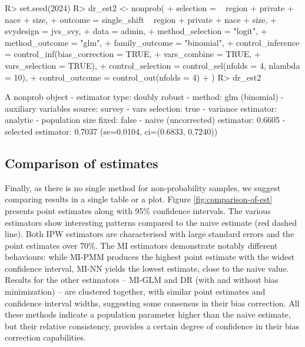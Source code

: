 \documentclass[
]{jss}
\begin{document}
\begin{CodeChunk}
\begin{CodeInput}
R> set.seed(2024)
R> dr_est2 <- nonprob(
+   selection = ~ region + private + nace + size,
+   outcome = single_shift ~ region + private + nace + size,
+   svydesign = jvs_svy,
+   data = admin,
+   method_selection = "logit",
+   method_outcome = "glm",
+   family_outcome = "binomial",
+   control_inference = control_inf(bias_correction = TRUE,
+                                   vars_combine = TRUE,
+                                   vars_selection = TRUE),
+   control_selection = control_sel(nfolds = 4, nlambda = 10),
+   control_outcome = control_out(nfolds = 4)
+ )
R> dr_est2
\end{CodeInput}
\begin{CodeOutput}
A nonprob object
 - estimator type: doubly robust
 - method: glm (binomial)
 - auxiliary variables source: survey
 - vars selection: true
 - variance estimator: analytic
 - population size fixed: false
 - naive (uncorrected) estimator: 0.6605
 - selected estimator: 0.7037 (se=0.0104, ci=(0.6833, 0.7240))
\end{CodeOutput}
\end{CodeChunk}

\subsection{Comparison of estimates}\label{comparison-of-estimates}

Finally, as there is no single method for non-probability samples, we
suggest comparing results in a single table or a plot. Figure
\ref{fig:comparison-of-est} presents point estimates along with 95\%
confidence intervals. The various estimators show interesting patterns
compared to the naive estimate (red dashed line). Both IPW estimators
are characterised with large standard errors and the point estimates
over 70\%. The MI estimators demonstrate notably different behaviours:
while MI-PMM produces the highest point estimate with the widest
confidence interval, MI-NN yields the lowest estimate, close to the
naive value. Results for the other estimators -- MI-GLM and DR (with and
without bias minimization) -- are clustered together, with similar point
estimates and confidence interval widths, suggesting some consensus in
their bias correction. All these methods indicate a population parameter
higher than the naive estimate, but their relative consistency, provides
a certain degree of confidence in their bias correction capabilities.
\end{document}
